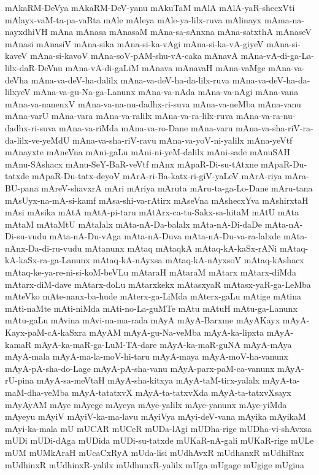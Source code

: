 {mAkaRM-DeVya
mAkaRM-DeV-yanu
mAkuTaM
mAlA
mAlA-yaR-shecxVti
mAlayx-vaM-ta-pa-vaRta
mAle
mAleya
mAle-ya-lilx-ruva
mAlinayx
mAma-na-nayxdhiVH
mAna
mAnasa
mAnasaM
mAna-sa-sAnxna
mAna-satxthA
mAnaseV
mAnasi
mAnasiV
mAna-sika
mAna-si-ka-vAgi
mAna-si-ka-vA-giyeV
mAna-si-kaveV
mAna-si-kavoV
mAna-soV-pAM-shu-vA-caka
mAnavA
mAna-vA-di-ga-La-lilx-daR-DeVnu
mAna-vA-di-gaLiM
mAnava
mAnavaH
mAna-vaMge
mAna-va-deVha
mAna-va-deV-ha-dalilx
mAna-va-deV-ha-da-lilx-ruva
mAna-va-deV-ha-da-lilxyeV
mAna-va-gu-Na-ga-Lanunx
mAna-va-nAda
mAna-va-nAgi
mAna-vana
mAna-va-nanenxV
mAna-va-na-nu-dadhx-ri-suva
mAna-va-neMba
mAna-vanu
mAna-varU
mAna-vara
mAna-va-ralilx
mAna-va-ra-lilx-ruva
mAna-va-ra-nu-dadhx-ri-suva
mAna-va-riMda
mAna-va-ro-Dane
mAna-varu
mAna-va-sha-riV-ra-da-lilx-ve-yeMdU
mAna-va-sha-riV-ravu
mAna-va-yoV-ni-yalilx
mAna-yeVtf
mAnayxte
mAneVna
mAni-gaLu
mAni-ni-yeM-dalilx
mAni-sade
mAnuSAH
mAnu-SAshacx
mAnu-SeY-BaR-veVtf
mAnx
mApaR-Di-su-tAtxne
mApaR-Du-tatxde
mApaR-Du-tatx-deyoV
mArA-ri-Ba-katx-ri-giV-yaLeV
mArA-riya
mAra-BU-pana
mAreV-shavxrA
mAri
mAriya
mAruta
mAru-ta-ga-Lo-Dane
mAru-tana
mAsUyx-na-mA-si-kamf
mAsa-shi-va-rAtirx
mAseVna
mAshecxYva
mAshirxtaH
mAsi
mAsika
mAtA
mAtA-pi-taru
mAtArx-ca-tu-Sakx-sa-hitaM
mAtU
mAta
mAtaM
mAtaMtU
mAtalalx
mAta-nA-Da-balalx
mAta-nA-Di-daDe
mAta-nA-Di-su-vudu
mAta-nA-Du-vAga
mAta-nA-Duva
mAta-nA-Du-va-ra-lalxde
mAta-nAnx-Da-di-ru-vudu
mAtanunx
mAtaq
mAtaqkA
mAtaq-kA-kaSx-rANi
mAtaq-kA-kaSx-ra-ga-Lanunx
mAtaq-kA-nAyxsa
mAtaq-kA-nAyxsoV
mAtaq-kAshacx
mAtaq-ke-ya-re-ni-si-koM-beVLu
mAtaraH
mAtaraM
mAtarx
mAtarx-diMda
mAtarx-diM-dave
mAtarx-doLu
mAtarxkekx
mAtasxyaR
mAtasx-yaR-ga-LeMba
mAteVko
mAte-nanx-ba-hude
mAterx-ga-LiMda
mAterx-gaLu
mAtige
mAtina
mAti-naMte
mAti-niMda
mAti-no-La-guMTe
mAtu
mAtuH
mAtu-ga-Lanunx
mAtu-gaLu
mAvina
mAvi-na-ma-rada
mAyA
mAyA-Barxme
mAyAKayx
mAyA-Kayx-paM-cA-kaSxra
mAyAM
mAyA-gu-Na-veMba
mAyA-ka-lipxta
mAyA-kamaR
mAyA-ka-maR-ga-LuM-TA-dare
mAyA-ka-maR-guNA
mAyA-mAya
mAyA-mala
mAyA-ma-la-moV-hi-taru
mAyA-maya
mAyA-moV-ha-vanunx
mAyA-pA-sha-do-Lage
mAyA-pA-sha-vanu
mAyA-parx-paM-ca-vanunx
mAyA-rU-pina
mAyA-sa-meVtaH
mAyA-sha-kitxya
mAyA-taM-tirx-yalalx
mAyA-ta-maM-dha-veMba
mAyA-tatatxvX
mAyA-ta-tatxvXda
mAyA-ta-tatxvXsayx
mAyAyAM
mAye
mAyege
mAyeya
mAye-yalilx
mAye-yanunx
mAye-yiMda
mAyeyu
mAyiV
mAyiV-ka-ma-lavu
mAyiVya
mAyi-deV-vana
mAyika
mAyikaM
mAyi-ka-mala
mU
mUCAR
mUCeR
mUDa-lAgi
mUDha-rige
mUDha-vi-shAvxsa
mUDi
mUDi-dAga
mUDida
mUDi-su-tatxde
mUKaR-nA-gali
mUKaR-rige
mULe
mUM
mUMkAraH
mUcaCxRyA
mUda-lisi
mUdhAvxR
mUdhanxR
mUdhiRnx
mUdhinxR
mUdhinxR-yalilx
mUdhunxR-yalilx
mUga
mUgage
mUgige
mUgina
}
